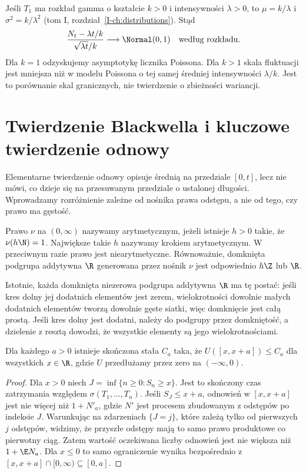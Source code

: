 \begin{przyklad}
Jeśli $T_1$ ma rozkład gamma o kształcie $k>0$
i intensywności $\lambda>0$, to $\mu=k/\lambda$
i $\sigma^2=k/\lambda^2$ (tom I,
rozdział~\ref{I-ch:distributions}).
Stąd
\[
\frac{N_t-\lambda t/k}{\sqrt{\lambda t}/k}
\longrightarrow\Normal(0,1)
\quad\text{według rozkładu}.
\]
Dla $k=1$ odzyskujemy asymptotykę licznika Poissona.
Dla $k>1$ skala fluktuacji jest mniejsza niż
w modelu Poissona o tej samej średniej intensywności
$\lambda/k$. Jest to porównanie skal granicznych,
nie twierdzenie o zbieżności wariancji.
\end{przyklad}

\section{Twierdzenie Blackwella i kluczowe twierdzenie odnowy}

Elementarne twierdzenie odnowy opisuje średnią na
przedziale $[0,t]$, lecz nie mówi, co dzieje się
na przesuwanym przedziale o ustalonej długości.
Wprowadzamy rozróżnienie zależne od nośnika prawa
odstępu, a nie od tego, czy prawo ma gęstość.

\begin{definicja}
Prawo $\nu$ na $(0,\infty)$ nazywamy arytmetycznym,
jeżeli istnieje $h>0$ takie, że
$\nu(h\N)=1$. Największe takie $h$ nazywamy krokiem
arytmetycznym. W przeciwnym razie prawo jest
niearytmetyczne. Równoważnie, domknięta podgrupa
addytywna $\R$ generowana przez nośnik $\nu$
jest odpowiednio $h\Z$ lub $\R$.
\end{definicja}
Istotnie, każda domknięta niezerowa podgrupa
addytywna $\R$ ma tę postać: jeśli kres dolny
jej dodatnich elementów jest zerem, wielokrotności
dowolnie małych dodatnich elementów tworzą dowolnie
gęste siatki, więc domknięcie jest całą prostą.
Jeśli kres dolny jest dodatni, należy do podgrupy
przez domkniętość, a dzielenie z resztą dowodzi,
że wszystkie elementy są jego wielokrotnościami.

\begin{lemat}
\label{lem:renewal-local-bound}
Dla każdego $a>0$ istnieje skończona stała $C_a$
taka, że $U([x,x+a])\le C_a$ dla wszystkich $x\in\R$,
gdzie $U$ przedłużamy przez zero na $(-\infty,0)$.
\end{lemat}
\begin{proof}
Dla $x>0$ niech $J=\inf\{n\ge0:S_n\ge x\}$.
Jest to skończony czas zatrzymania względem
$\sigma(T_1,\ldots,T_n)$.
Jeśli $S_J\le x+a$, odnowień w $[x,x+a]$ jest
nie więcej niż $1+N'_a$, gdzie $N'$ jest procesem
zbudowanym z odstępów po indeksie $J$.
Warunkując na zdarzeniach $\{J=j\}$, które zależą
tylko od pierwszych $j$ odstępów, widzimy,
że przyszłe odstępy mają to samo prawo produktowe
co pierwotny ciąg. Zatem wartość oczekiwana
liczby odnowień jest nie większa niż $1+\E N_a$.
Dla $x\le0$ to samo ograniczenie wynika bezpośrednio
z $[x,x+a]\cap[0,\infty)\subseteq[0,a]$.
\end{proof}

